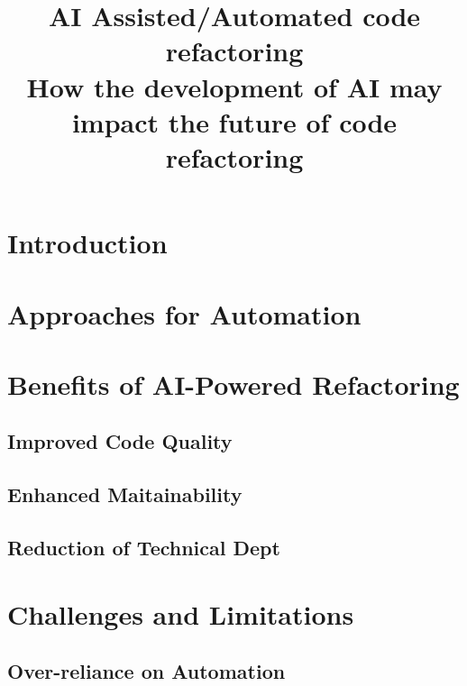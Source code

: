 \documentclass[conference]{IEEEtran}
\begin{document}
\title{AI Assisted/Automated code refactoring\\
{\footnotesize How the development of AI may impact the future of code refactoring}
}

\author{
    \and
}

\maketitle



\section{Introduction}\label{introduction}


\section{Approaches for Automation}\label{automation}


\section{Benefits of AI-Powered Refactoring}\label{benefits}
\subsection{Improved Code Quality}
\subsection{Enhanced Maitainability}
\subsection{Reduction of Technical Dept}

\section{Challenges and Limitations}
\subsection{Over-reliance on Automation}
\end{document}
